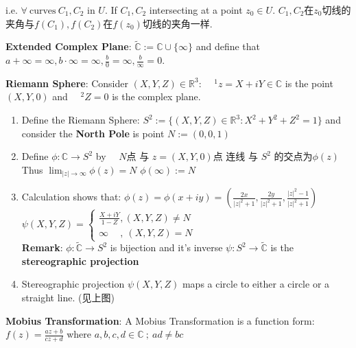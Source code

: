 \documentclass[9pt]{article}
\begin{document}
\quad i.e. $\forall \ \text{curves} \ C_1,C_2$ in $U$. If $C_1,C_2$ intersecting at a point $z_0\in U$. {\scriptsize $C_1,C_2$在$z_0$切线的夹角与$f(C_1),f(C_2)$在$f(z_0)$切线的夹角一样.}

\textbf{Extended Complex Plane}: $\widetilde{\mathbb{C}}:=\mathbb{C}\cup\{\infty\}$ and define that $a+\infty=\infty,b\cdot\infty=\infty,\frac{b}{0}=\infty,\frac{b}{\infty}=0$.

\textbf{Riemann Sphere}: Consider $(X,Y,Z)\in\mathbb{R}^3$: \ \ $^1z=X+iY\in\mathbb{C}$ is the point $(X,Y,0)$ and \ \ $^2 Z=0$ is the complex plane.

\begin{enumerate}[itemsep=-2pt, topsep=-2pt]
    \item Define the Riemann Sphere: $S^2:=\{(X,Y,Z)\in\mathbb{R}^3:X^2+Y^2+Z^2=1\}$ and consider the \textbf{North Pole} is point $N:=(0,0,1)$
    \item Define $\phi:\mathbb{C}\to S^2$ by \ \ $N$点 与 $z=(X,Y,0)$点 连线 与 $S^2$ 的交点为$\phi(z)$ \quad \quad Thus $\lim_{|z|\to\infty}\phi(z)=N$ \quad $\phi(\infty):=N$
    \item Calculation shows that: $\phi(z)=\phi(x+iy)=\left(\frac{2x}{|z|^2+1},\frac{2y}{|z|^2+1},\frac{|z|^2-1}{|z|^2+1}\right)$ \qquad \qquad $\psi(X,Y,Z)=\begin{cases}\frac{X+iY}{1-Z} , (X,Y,Z)\ne N \\ \infty \quad \ , \ (X,Y,Z)=N\end{cases}$ \\
    \textbf{Remark}: $\phi:\widetilde{\mathbb{C}}\to S^2$ is bijection and it's inverse $\psi:S^2\to\widetilde{\mathbb{C}}$ is the \textbf{stereographic projection}
    \item Stereographic projection $\psi(X,Y,Z)$ maps a circle to either a circle or a straight line. (见上图)
\end{enumerate}

\textbf{Mobius Transformation}: A Mobius Transformation is a function form: $f(z)=\frac{az+b}{cz+d}$ where $a,b,c,d\in\mathbb{C} \ ; \ ad\ne bc$
\end{document}
